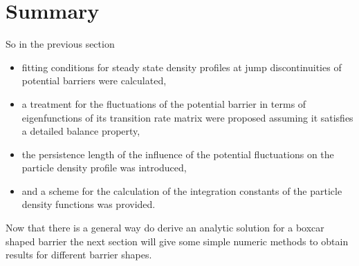 \section{Summary}
        So in the previous section 
\begin{itemize}
    \item fitting conditions for steady state density profiles at jump discontinuities of potential barriers were calculated,
    \item a treatment for the fluctuations of the potential barrier in terms of eigenfunctions of its transition rate matrix were proposed assuming it satisfies a detailed balance property,
    \item  the persistence length of the influence of the potential fluctuations on the particle density profile was introduced,
    \item and a scheme for the calculation of the integration constants of the particle density functions was provided.
\end{itemize}
Now that there is a general way do derive an analytic solution for a boxcar shaped barrier the next section will give some simple numeric methods to obtain results for different barrier shapes.
\newpage

